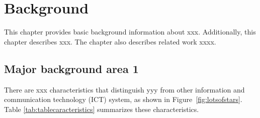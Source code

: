 \chapter{Background}

\label{ch:background}


This chapter provides basic background information about xxx. Additionally, this chapter describes xxx. The chapter also describes related work xxxx.




\section{Major background area 1}
There are xxx characteristics that distinguish yyy from other information and communication technology (ICT) system, as shown in Figure~\ref{fig:lotsofstars}. Table \ref{tab:tablecaracteristics} summarizes these characteristics.

